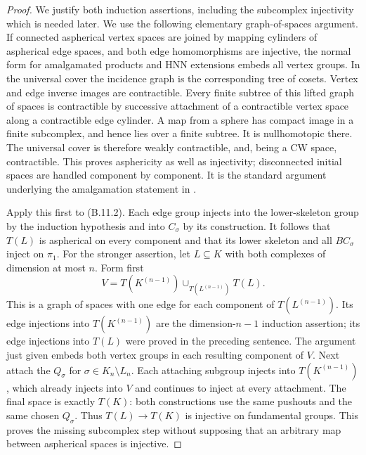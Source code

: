 \begin{proof}
We justify both induction assertions, including the
subcomplex injectivity which is needed later. We use the
following elementary graph-of-spaces argument. If connected
aspherical vertex spaces are joined by mapping cylinders
of aspherical edge spaces, and both edge homomorphisms
are injective, the normal form for amalgamated products and
HNN extensions embeds all vertex groups. In the universal
cover the incidence graph is the corresponding tree of
cosets. Vertex and edge inverse images are contractible.
Every finite subtree of this lifted graph of spaces is
contractible by successive attachment of a contractible
vertex space along a contractible edge cylinder. A map
from a sphere has compact image in a finite subcomplex,
and hence lies over a finite subtree. It is nullhomotopic
there. The universal cover is therefore weakly contractible,
and, being a CW space, contractible. This proves
asphericity as well as injectivity; disconnected initial
spaces are handled component by component. It is the
standard argument underlying the amalgamation statement
in \citet[\S1, before Proposition~1.1]{BaumslagDyerHeller1980}.

Apply this first to (B.11.2). Each edge group injects into
the lower-skeleton group by the induction hypothesis and
into $C_\sigma$ by its construction. It follows that
$T(L)$ is aspherical on every component and that its lower
skeleton and all $BC_\sigma$ inject on $\pi_1$.
For the stronger assertion, let $L\subseteq K$ with both
complexes of dimension at most $n$. Form first
\[
 V=T(K^{(n-1)})\cup_{T(L^{(n-1)})}T(L).
 \tag{B.11.3}
\]
This is a graph of spaces with one edge for each component
of $T(L^{(n-1)})$. Its edge injections into
$T(K^{(n-1)})$ are the dimension-$n-1$ induction assertion;
its edge injections into $T(L)$ were proved in the preceding
sentence. The argument just given embeds both vertex groups
in each resulting component of $V$. Next attach the
$Q_\sigma$ for $\sigma\in K_n\setminus L_n$. Each
attaching subgroup injects into $T(K^{(n-1)})$, which already
injects into $V$ and continues to inject at every attachment.
The final space is exactly $T(K)$: both constructions use
the same pushouts and the same chosen $Q_\sigma$. Thus
$T(L)\to T(K)$ is injective on fundamental groups.
This proves the missing subcomplex step without supposing
that an arbitrary map between aspherical spaces is injective.


\end{proof}

